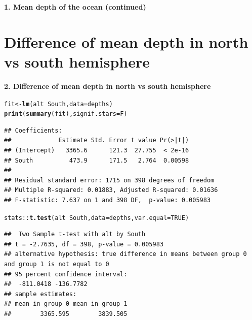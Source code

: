 \documentclass[10pt]{beamer}\usepackage[]{graphicx}\usepackage[]{color}
\makeatletter
\newcommand{\hlnum}[1]{\textcolor[rgb]{0.686,0.059,0.569}{#1}}%
\newcommand{\hlopt}[1]{\textcolor[rgb]{0,0,0}{#1}}%
\newcommand{\hlstd}[1]{\textcolor[rgb]{0.345,0.345,0.345}{#1}}%
\newcommand{\hlkwb}[1]{\textcolor[rgb]{0.69,0.353,0.396}{#1}}%
\newcommand{\hlkwc}[1]{\textcolor[rgb]{0.333,0.667,0.333}{#1}}%
\newcommand{\hlkwd}[1]{\textcolor[rgb]{0.737,0.353,0.396}{\textbf{#1}}}%
\newenvironment{kframe}{%
 \def\at@end@of@kframe{}%
 \ifinner\ifhmode%
  \def\at@end@of@kframe{\end{minipage}}%
  \begin{minipage}{\columnwidth}%
 \fi\fi%
 \def\FrameCommand##1{\hskip\@totalleftmargin \hskip-\fboxsep
 \colorbox{shadecolor}{##1}\hskip-\fboxsep
     \hskip-\linewidth \hskip-\@totalleftmargin \hskip\columnwidth}%
 \MakeFramed {\advance\hsize-\width
   \@totalleftmargin\z@ \linewidth\hsize
   \@setminipage}}%
 {\par\unskip\endMakeFramed%
 \at@end@of@kframe}
\newenvironment{knitrout}{}{} %
\makeatother
\begin{document}
\begin{frame}
	\vspace*{-5.0in}
	\textbf{1. Mean depth of the ocean (continued)}
	
\end{frame}


\section{Difference of mean depth in north vs south hemisphere}

\begin{frame}
\vspace*{-.90551in}
\textbf{2. Difference of mean depth in north vs south hemisphere}

	
	
\begin{knitrout}\tiny
{}\color{fgcolor}\begin{kframe}
\begin{alltt}
\hlstd{fit} \hlkwb{<-} \hlkwd{lm}\hlstd{(alt} \hlopt{~} \hlstd{South,} \hlkwc{data} \hlstd{= depths)}
\hlkwd{print}\hlstd{(}\hlkwd{summary}\hlstd{(fit),} \hlkwc{signif.stars} \hlstd{= F)}
\end{alltt}
\begin{verbatim}
## Coefficients:
##             Estimate Std. Error t value Pr(>|t|)
## (Intercept)   3365.6      121.3  27.755  < 2e-16
## South          473.9      171.5   2.764  0.00598
## 
## Residual standard error: 1715 on 398 degrees of freedom
## Multiple R-squared: 0.01883,	Adjusted R-squared: 0.01636 
## F-statistic: 7.637 on 1 and 398 DF,  p-value: 0.005983
\end{verbatim}
\begin{alltt}
\hlstd{stats}\hlopt{::}\hlkwd{t.test}\hlstd{(alt} \hlopt{~} \hlstd{South,} \hlkwc{data} \hlstd{= depths,} \hlkwc{var.equal} \hlstd{=} \hlnum{TRUE}\hlstd{)}
\end{alltt}
\begin{verbatim}
##  Two Sample t-test with alt by South 
## t = -2.7635, df = 398, p-value = 0.005983
## alternative hypothesis: true difference in means between group 0 and group 1 is not equal to 0 
## 95 percent confidence interval:
##  -811.0418 -136.7782 
## sample estimates:
## mean in group 0 mean in group 1 
##        3365.595        3839.505
\end{verbatim}
\end{kframe}
\end{knitrout}
\end{frame}
\end{document}
